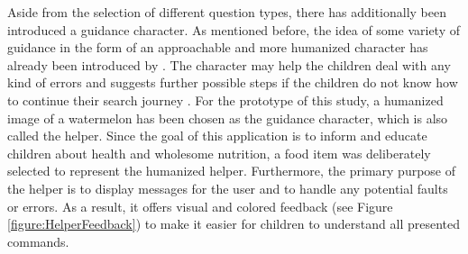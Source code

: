 Aside from the selection of different question types, there has additionally been introduced a guidance character. As mentioned before, the idea of some variety of guidance in the form of an approachable and more humanized character has already been introduced by \textcite{gossen2012search}. The character may help the children deal with any kind of errors and suggests further possible steps if the children do not know how to continue their search journey \autocite{gossen2012search}. For the prototype of this study, a humanized image of a watermelon has been chosen as the guidance character, which is also called the helper. Since the goal of this application is to inform and educate children about health and wholesome nutrition, a food item was deliberately selected to represent the humanized helper. 
Furthermore, the primary purpose of the helper is to display messages for the user and to handle any potential faults or errors. As a result, it offers visual and colored feedback (see Figure \ref{figure:HelperFeedback}) to make it easier for children to understand all presented commands. \\
